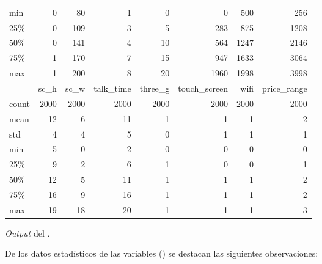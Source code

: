 \documentclass[12pt,twocolumn,a4paper]{apa_article}
\begin{document}
\begin{table*}
\begin{threeparttable}
\begin{tabular}{lrrrrrrr}
      min   &      0 &         80 &        1 &     0 &          0 &       500 &   256 \\
      25\%   &      0 &        109 &        3 &     5 &        283 &       875 &  1208 \\
      50\%   &      0 &        141 &        4 &    10 &        564 &      1247 &  2146 \\
      75\%   &      1 &        170 &        7 &    15 &        947 &      1633 &  3064 \\
      max   &      1 &        200 &        8 &    20 &       1960 &      1998 &  3998 \\
      \bottomrule
      \toprule
      {} &  sc\_h &  sc\_w &  talk\_time &  three\_g &  touch\_screen &  wifi &  price\_range \\
      \midrule
      count &  2000 &  2000 &       2000 &     2000 &          2000 &  2000 &         2000 \\
      mean  &    12 &     6 &         11 &        1 &             1 &     1 &            2 \\
      std   &     4 &     4 &          5 &        0 &             1 &     1 &            1 \\
      min   &     5 &     0 &          2 &        0 &             0 &     0 &            0 \\
      25\%   &     9 &     2 &          6 &        1 &             0 &     0 &            1 \\
      50\%   &    12 &     5 &         11 &        1 &             1 &     1 &            2 \\
      75\%   &    16 &     9 &         16 &        1 &             1 &     1 &            2 \\
      max   &    19 &    18 &         20 &        1 &             1 &     1 &            3 \\
      \bottomrule
    \end{tabular}
		\begin{tablenotes}
			\item {\textnormal{\small \textit{Output} del .}}
		\end{tablenotes}
	\end{threeparttable}
\end{table*}

De los datos estadísticos de las variables () se destacan las siguientes observaciones:
\end{document}
